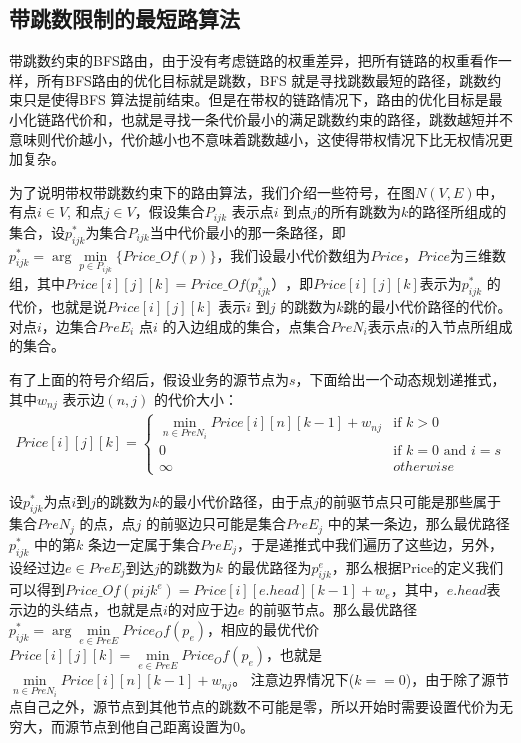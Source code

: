 \subsection{带跳数限制的最短路算法}
  
带跳数约束的BFS路由，由于没有考虑链路的权重差异，把所有链路的权重看作一样，所有BFS路由的优化目标就是跳数，BFS 就是寻找跳数最短的路径，跳数约束只是使得BFS 算法提前结束。但是在带权的链路情况下，路由的优化目标是最小化链路代价和，也就是寻找一条代价最小的满足跳数约束的路径，跳数越短并不意味则代价越小，代价越小也不意味着跳数越小，这使得带权情况下比无权情况更加复杂。
  
为了说明带权带跳数约束下的路由算法，我们介绍一些符号，在图$N(V,E)$中，有点$i \in V$, 和点$j \in V$，假设集合$P_{ijk}$ 表示点$i$ 到点$j$的所有跳数为$k$的路径所组成的集合，设$p_{ijk}^*$为集合$P_{ijk}$当中代价最小的那一条路径，即$p_{ijk}^* =\arg\min\limits_{p \in P_{ijk}}\{Price\_Of(p)\}$，我们设最小代价数组为$Price$，$Price$为三维数组，其中$Price[i][j][k]=Price\_Of(p_{ijk}^*）$，即$Price[i][j][k]$表示为$p_{ijk}^*$ 的代价，也就是说$Price[i][j][k]$ 表示$i$ 到$j$ 的跳数为$k$跳的最小代价路径的代价。对点$i$，边集合$PreE_i$ 点$i$ 的入边组成的集合，点集合$PreN_i$表示点$i$的入节点所组成的集合。

有了上面的符号介绍后，假设业务的源节点为$s$，下面给出一个动态规划递推式，其中$w_{nj}$ 表示边$(n,j)$ 的代价大小：
\begin{equation}\label{dynamic}
\begin{split}
Price[i][j][k]
=\begin{cases}
\min\limits_{n \in PreN_i}{Price[i][n][k-1]+w_{nj}} & \text{if $k>0$}\\
0 & \text{if $k=0$ and $i=s $} \\
\infty &{otherwise}
\end{cases}
\end{split}
\end{equation}

设$p_{ijk}^*$为点$i$到$j$的跳数为$k$的最小代价路径，由于点$j$的前驱节点只可能是那些属于集合$PreN_j$ 的点，点$j$ 的前驱边只可能是集合$PreE_j$ 中的某一条边，那么最优路径$p_{ijk}^*$ 中的第$k$ 条边一定属于集合$PreE_j$，于是递推式中我们遍历了这些边，另外，设经过边$e \in PreE_j$到达$j$的跳数为$k$ 的最优路径为$p_{ijk}^e$，那么根据Price的定义我们可以得到$Price\_Of(p{ijk}^e)=Price[i][e.head][k-1]+w_e$，其中，$e.head$表示边的头结点，也就是点$i$的对应于边$e$ 的前驱节点。那么最优路径$p_{ijk}^*=\arg\min\limits_{e \in PreE}{Price_Of(p_e)}$，相应的最优代价$Price[i][j][k]=\min\limits_{e \in PreE}{Price_Of(p_e)}$，也就是$\min\limits_{n \in PreN_i}{Price[i][n][k-1]+w_{nj}}$。 注意边界情况下($k==0$)，由于除了源节点自己之外，源节点到其他节点的跳数不可能是零，所以开始时需要设置代价为无穷大，而源节点到他自己距离设置为0。

